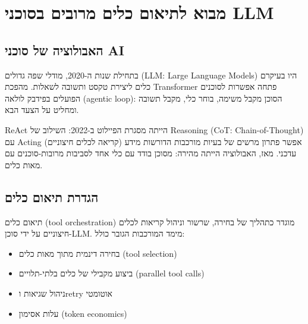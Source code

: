 
\clearpage
\chapter{מבוא לתיאום כלים מרובים בסוכני \textenglish{LLM}}

\section{האבולוציה של סוכני \textenglish{AI}}

בתחילת שנות ה-\textenglish{2020}, מודלי שפה גדולים (\textenglish{LLM}: \textenglish{Large Language Models}) \cite{brown2020language} היו בעיקרם כלים ליצירת טקסט ותשובה לשאלות. מהפכת \textenglish{Transformer} \cite{vaswani2017attention} פתחה אפשרות לסוכנים הפועלים בפידבק לולאה (\textenglish{agentic loop}): הסוכן מקבל משימה, בוחר כלי, מקבל תשובה ומחליט על הצעד הבא.

\textenglish{ReAct} \cite{yao2022react} הייתה מסגרת הפיילוט ב-\textenglish{2022}: השילוב של \textenglish{Reasoning} (\textenglish{CoT}: \textenglish{Chain-of-Thought}) עם \textenglish{Acting} (קריאה לכלים חיצוניים) אפשר פתרון מרשים של בעיות מורכבות הדורשות מידע עדכני. מאז, האבולוציה הייתה מהירה: מסוכן בודד עם כלי אחד לסביבות מרובות-סוכנים עם מאות כלים.

\section{הגדרת תיאום כלים}

תיאום כלים (\textenglish{tool orchestration}) מוגדר כתהליך של בחירה, שרשור וניהול קריאות לכלים חיצוניים על ידי סוכן-\textenglish{LLM}. מימד המורכבות הגובר כולל:
\begin{itemize}
\item בחירה דינמית מתוך מאות כלים (\textenglish{tool selection})
\item ביצוע מקבילי של כלים בלתי-תלויים (\textenglish{parallel tool calls})
\item ניהול שגיאות ו\textenglish{retry} אוטומטי
\item עלות אסימון (\textenglish{token economics}) \cite{segal2024orchestration}
\end{itemize}
